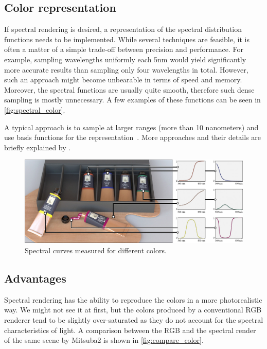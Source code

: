 \subsection{Color representation}

If spectral rendering is desired, a representation of the spectral distribution functions needs to be implemented. While several techniques are feasible, it is often a matter of a simple trade-off between precision and performance. For example, sampling wavelengths uniformly each 5nm would yield significantly more accurate results than sampling only four wavelengths in total. However, such an approach might become unbearable in terms of speed and memory. Moreover, the spectral functions are usually quite smooth, therefore such dense sampling is mostly unnecessary. A few examples of these functions can be seen in \autoref{fig:spectral_color}.

A typical approach is to sample at larger ranges (more than 10 nanometers) and use basis functions for the representation~\cite{peercy1993linear}. More approaches and their details are briefly explained by \citet{wilkie2002tone}.

\begin{figure}[httpb]
	\centering
	\includegraphics[width=.9\linewidth]{img/spectral_color.jpg}
	\caption{Spectral curves measured for different colors\cite{jakob2019low}.}
	\label{fig:spectral_color}
\end{figure}

\subsection{Advantages}

Spectral rendering has the ability to reproduce the colors in a more photorealistic way. We might not see it at first, but the colors produced by a conventional RGB renderer tend to be slightly over-saturated as they do not account for the spectral characteristics of light. A comparison between the RGB and the spectral render of the same scene by Mitsuba2 is shown in \autoref{fig:compare_color}.

